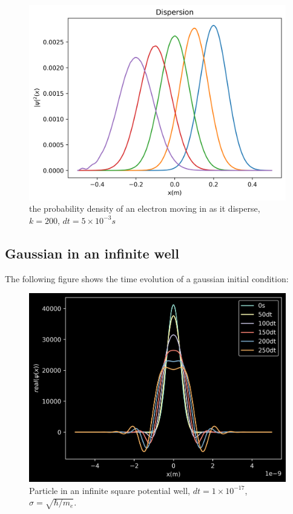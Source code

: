 \documentclass[10pt, a4paper]{article}
\begin{document}
\begin{adjustwidth}{1cm}{}
\begin{figure}[H]
    \centering
    \includegraphics[scale = 0.6]{DispersionP.png}
    \caption{the probability density of an electron moving in as it disperse, $k = 200$, $dt = 5\times10^{-3}s$}
    \label{fig:dispersion_probability}
\end{figure}

\newpage

\subsection{Gaussian in an infinite well}
The following figure shows the time evolution of a gaussian initial condition:
\begin{figure}[H]
    \centering
    \includegraphics{dispersion.png}
    \caption{Particle in an infinite square potential well, $dt = 1\times10^{-17}$, $\sigma = \sqrt{\hbar/m_e}$.}
    \label{fig:gauss}
\end{figure}


\end{adjustwidth}
\end{document}
